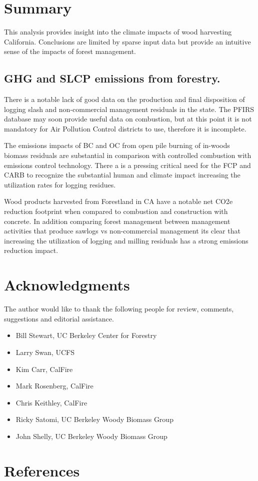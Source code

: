 \documentclass[a4paper,titlepage]{article}
\begin{document}
\section{Summary}
\label{sec:orgheadline24}

This analysis provides insight into the climate impacts of wood harvesting California. Conclusions are limited by sparse input data but provide an intuitive sense of the impacts of forest management.

\subsection{\acl{GHG} and \acl{SLCP} emissions from forestry.}
\label{sec:orgheadline23}

There is a notable lack of good data on the production and final disposition of logging slash and non-commercial management residuals in the state.  The PFIRS database may soon provide useful data on combustion, but at this point it is not mandatory for Air Pollution Control districts to use, therefore it is incomplete. 

The emissions impacts of \ac{BC} and \ac{OC} from open pile burning of in-woods biomass residuals are substantial in comparison with controlled combustion with emissions control technology. There a is a pressing critical need for the \ac{FCP} and \ac{CARB} to recognize the substantial human and climate impact increasing the utilization rates for logging residues.

Wood products harvested from Forestland in CA have a notable net \ac{CO2e} reduction footprint when compared to combustion and construction with concrete. In addition comparing forest management between management activities that produce sawlogs vs non-commercial management its clear that increasing the utilization of logging and milling residuals has a strong emissions reduction impact.


\section{Acknowledgments}
\label{sec:orgheadline25}

The author would like to thank the following people for review, comments, suggestions and editorial assistance.

\begin{itemize}
\item Bill Stewart, UC Berkeley Center for Forestry
\item Larry Swan, UCFS
\item Kim Carr, CalFire
\item Mark Rosenberg, CalFire
\item Chris Keithley, CalFire
\item Ricky Satomi, UC Berkeley Woody Biomass Group
\item John Shelly, UC Berkeley Woody Biomass Group
\end{itemize}

\section{References}
\label{sec:orgheadline26}


\end{document}
